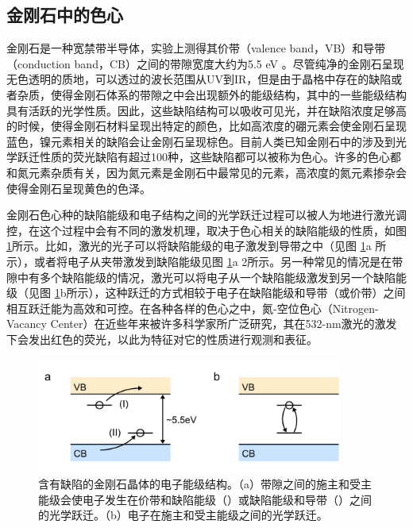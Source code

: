 \documentclass[type = bachelor, oneside]{whu-thesis}
\begin{document}
\subsection{金刚石中的色心}
金刚石是一种宽禁带半导体，实验上测得其价带（valence band，VB）和导带（conduction band，CB）之间的带隙宽度大约为5.5 \unit{\eV} \cite{2013,Cheng2023,Wort2008}。尽管纯净的金刚石呈现无色透明的质地，可以透过的波长范围从UV到IR，但是由于晶格中存在的缺陷或者杂质，使得金刚石体系的带隙之中会出现额外的能级结构，其中的一些能级结构具有活跃的光学性质。因此，这些缺陷结构可以吸收可见光，并在缺陷浓度足够高的时候，使得金刚石材料呈现出特定的颜色，比如高浓度的硼元素会使金刚石呈现蓝色，镍元素相关的缺陷会让金刚石呈现棕色。目前人类已知金刚石中的涉及到光学跃迁性质的荧光缺陷有超过100种，这些缺陷都可以被称为色心\cite{2008,Jelezko2006}。许多的色心都和氮元素杂质有关，因为氮元素是金刚石中最常见的元素，高浓度的氮元素掺杂会使得金刚石呈现黄色的色泽\cite{Breeding2020, Zaitsev2016}。

金刚石色心种的缺陷能级和电子结构之间的光学跃迁过程可以被人为地进行激光调控，在这个过程中会有不同的激发机理，取决于色心相关的缺陷能级的性质，如图 \ref{fig: Optical Transition}所示。比如，激光的光子可以将缺陷能级的电子激发到导带之中（见图 \ref{fig: Optical Transition}a \uppercase\expandafter{}所示），或者将电子从夹带激发到缺陷能级见图 \ref{fig: Optical Transition}a \uppercase\expandafter{\romannumeral2所示}。另一种常见的情况是在带隙中有多个缺陷能级的情况，激光可以将电子从一个缺陷能级激发到另一个缺陷能级（见图 \ref{fig: Optical Transition}b所示），这种跃迁的方式相较于电子在缺陷能级和导带（或价带）之间相互跃迁能为高效和可控\cite{Gali2010,Gali2012}。在各种各样的色心之中，氮-空位色心（Nitrogen-Vacancy Center）在近些年来被许多科学家所广泛研究，其在532-nm激光的激发下会发出红色的荧光，以此为特征对它的性质进行观测和表征\cite{Doherty2013}。

\begin{figure}
  \centering
  \includegraphics[width=0.9\textwidth]{figures/Chapter 2/Optical Transition.png}
  \caption[含有缺陷的金刚石晶体的电子能级结构]{含有缺陷的金刚石晶体的电子能级结构。（a）带隙之间的施主和受主能级会使电子发生在价带和缺陷能级（\uppercase\expandafter{}）或缺陷能级和导带（\uppercase\expandafter{}）之间的光学跃迁。（b）电子在施主和受主能级之间的光学跃迁\cite{Staudacher2015}。}
  \label{fig: Optical Transition}
\end{figure}
\end{document}
